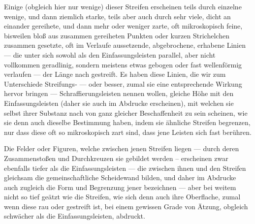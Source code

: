 \documentclass[a4paper, 11pt, oneside, german]{article}
\begin{document}
Einige (obgleich hier nur wenige) dieser Streifen erscheinen teils durch einzelne wenige, und dann ziemlich starke, teils aber auch durch sehr viele, dicht an einander gereihete, und dann mehr oder weniger zarte, oft mikroskopisch feine, bisweilen bloß aus zusammen gereiheten Punkten oder kurzen Strichelchen zusammen gesetzte, oft im Verlaufe aussetzende, abgebrochene, erhabene Linien --- die unter sich sowohl als den Einfassungsleisten parallel, aber nicht vollkommen geradlinig, sondern meistens etwas gebogen oder fast wellenförmig verlaufen --- der Länge nach gestreift. Es haben diese Linien, die wir zum Unterschiede Streifungs- --- oder besser, zumal sie eine entsprechende Wirkung hervor bringen --- Schraffierungsleisten nennen wollen, gleiche Höhe mit den Einfassungsleisten (daher sie auch im Abdrucke erscheinen), mit welchen sie selbst ihrer Substanz nach von ganz gleicher Beschaffenheit zu sein scheinen, wie sie denn auch dieselbe Bestimmung haben, indem sie ähnliche Streifen begrenzen, nur dass diese oft so mikroskopisch zart sind, dass jene Leisten sich fast berühren.

Die Felder oder Figuren, welche zwischen jenen Streifen liegen --- durch deren Zusammenstoßen und Durchkreuzen sie gebildet werden -- erscheinen zwar ebenfalls tiefer als die Einfassungsleisten --- die zwischen ihnen und den Streifen gleichsam die gemeinschaftliche Scheidewand bilden, und daher im Abdrucke auch zugleich die Form und Begrenzung jener bezeichnen --- aber bei weitem nicht so tief geätzt wie die Streifen, wie sich denn auch ihre Oberflache, zumal wenn diese rau oder gestreift ist, bei einem gewissen Grade von Ätzung, obgleich schwächer als die Einfassungsleisten, abdruckt.
\end{document}
